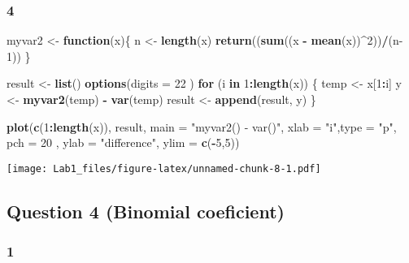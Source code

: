 \documentclass[
]{article}
\newenvironment{Shaded}{\begin{snugshade}}{\end{snugshade}}
\newcommand{\ControlFlowTok}[1]{\textcolor[rgb]{0.13,0.29,0.53}{\textbf{#1}}}
\newcommand{\DataTypeTok}[1]{\textcolor[rgb]{0.13,0.29,0.53}{#1}}
\newcommand{\DecValTok}[1]{\textcolor[rgb]{0.00,0.00,0.81}{#1}}
\newcommand{\KeywordTok}[1]{\textcolor[rgb]{0.13,0.29,0.53}{\textbf{#1}}}
\newcommand{\NormalTok}[1]{#1}
\newcommand{\OperatorTok}[1]{\textcolor[rgb]{0.81,0.36,0.00}{\textbf{#1}}}
\newcommand{\StringTok}[1]{\textcolor[rgb]{0.31,0.60,0.02}{#1}}
\begin{document}
\hypertarget{section-8}{%
\subsubsection{4}\label{section-8}}

\begin{Shaded}
\begin{Highlighting}[]
\NormalTok{myvar2 <-}\StringTok{ }\ControlFlowTok{function}\NormalTok{(x)\{}
\NormalTok{  n <-}\StringTok{ }\KeywordTok{length}\NormalTok{(x)}
  \KeywordTok{return}\NormalTok{((}\KeywordTok{sum}\NormalTok{((x }\OperatorTok{-}\StringTok{ }\KeywordTok{mean}\NormalTok{(x))}\OperatorTok{^}\DecValTok{2}\NormalTok{))}\OperatorTok{/}\NormalTok{(n}\DecValTok{-1}\NormalTok{))}
\NormalTok{\}}

\NormalTok{result <-}\StringTok{ }\KeywordTok{list}\NormalTok{()}
\KeywordTok{options}\NormalTok{(}\DataTypeTok{digits =} \DecValTok{22}\NormalTok{ )}
\ControlFlowTok{for}\NormalTok{ (i }\ControlFlowTok{in} \DecValTok{1}\OperatorTok{:}\KeywordTok{length}\NormalTok{(x)) \{}
\NormalTok{  temp <-}\StringTok{ }\NormalTok{x[}\DecValTok{1}\OperatorTok{:}\NormalTok{i]}
\NormalTok{  y <-}\StringTok{ }\KeywordTok{myvar2}\NormalTok{(temp) }\OperatorTok{-}\StringTok{ }\KeywordTok{var}\NormalTok{(temp)}
\NormalTok{  result <-}\StringTok{ }\KeywordTok{append}\NormalTok{(result, y)}
\NormalTok{\}}

\KeywordTok{plot}\NormalTok{(}\KeywordTok{c}\NormalTok{(}\DecValTok{1}\OperatorTok{:}\KeywordTok{length}\NormalTok{(x)), result, }\DataTypeTok{main =} \StringTok{"myvar2() - var()"}\NormalTok{, }\DataTypeTok{xlab =} \StringTok{"i"}\NormalTok{,}\DataTypeTok{type =} \StringTok{"p"}\NormalTok{,}
     \DataTypeTok{pch =} \DecValTok{20}\NormalTok{ , }\DataTypeTok{ylab =} \StringTok{"difference"}\NormalTok{, }\DataTypeTok{ylim =} \KeywordTok{c}\NormalTok{(}\OperatorTok{-}\DecValTok{5}\NormalTok{,}\DecValTok{5}\NormalTok{))}
\end{Highlighting}
\end{Shaded}

\texttt{[image: Lab1\_files/figure-latex/unnamed-chunk-8-1.pdf]}

\hypertarget{question-4-binomial-coeficient}{%
\subsection{Question 4 (Binomial
coeficient)}\label{question-4-binomial-coeficient}}

\hypertarget{section-9}{%
\subsubsection{1}\label{section-9}}
\end{document}
